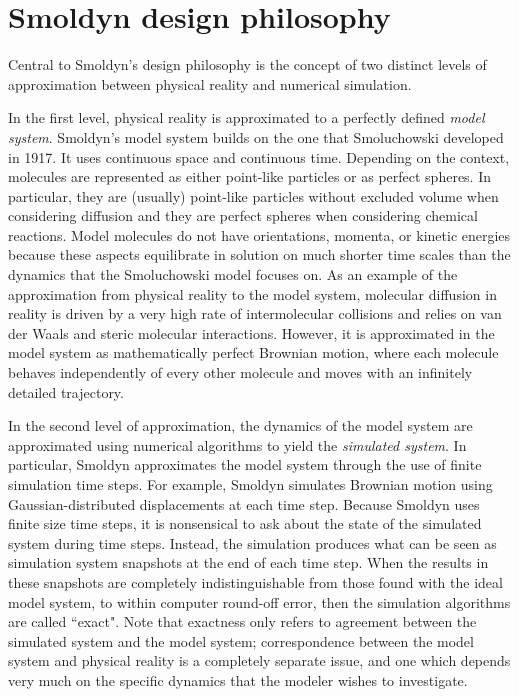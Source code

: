 \documentclass {scrbook}
\begin{document}
\section{Smoldyn design philosophy}

Central to Smoldyn's design philosophy is the concept of two distinct levels of approximation between physical reality and numerical simulation.

In the first level, physical reality is approximated to a perfectly defined \emph{model system}. Smoldyn's model system builds on the one that Smoluchowski developed in 1917. It uses continuous space and continuous time. Depending on the context, molecules are represented as either point-like particles or as perfect spheres. In particular, they are (usually) point-like particles without excluded volume when considering diffusion and they are perfect spheres when considering chemical reactions. Model molecules do not have orientations, momenta, or kinetic energies because these aspects equilibrate in solution on much shorter time scales than the dynamics that the Smoluchowski model focuses on. As an example of the approximation from physical reality to the model system, molecular diffusion in reality is driven by a very high rate of intermolecular collisions and relies on van der Waals and steric molecular interactions. However, it is approximated in the model system as mathematically perfect Brownian motion, where each molecule behaves independently of every other molecule and moves with an infinitely detailed trajectory.

In the second level of approximation, the dynamics of the model system are approximated using numerical algorithms to yield the \emph{simulated system}. In particular, Smoldyn approximates the model system through the use of finite simulation time steps. For example, Smoldyn simulates Brownian motion using Gaussian-distributed displacements at each time step. Because Smoldyn uses finite size time steps, it is nonsensical to ask about the state of the simulated system during time steps. Instead, the simulation produces what can be seen as simulation system snapshots at the end of each time step. When the results in these snapshots are completely indistinguishable from those found with the ideal model system, to within computer round-off error, then the simulation algorithms are called ``exact". Note that exactness only refers to agreement between the simulated system and the model system; correspondence between the model system and physical reality is a completely separate issue, and one which depends very much on the specific dynamics that the modeler wishes to investigate.
\end{document}
